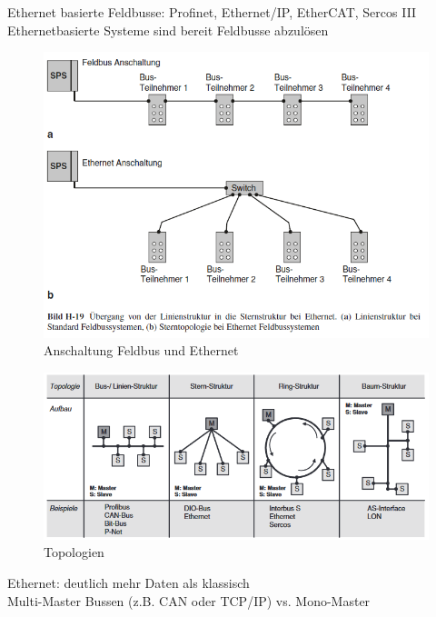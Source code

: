\documentclass[ a4paper,
                oneside,
                toc=bibliography,
                toc=listof
                ]{scrbook}
\begin{document}
	Ethernet basierte Feldbusse: Profinet, Ethernet/IP, EtherCAT, Sercos III \\
	Ethernetbasierte Systeme sind bereit Feldbusse abzulösen \\
	\begin{figure}[!ht]
		\centering
		\includegraphics[width=1.0\linewidth]{./images/Feldbus vs Ethernet Anschaltung.png}
		\caption{Anschaltung Feldbus und Ethernet \cite{hering2012elektrotechnik}}
		\label{fig:Anschaltung Bus}
	\end{figure}
	\begin{figure}[!ht]
		\centering
		\includegraphics[width=1.0\linewidth]{./images/Topologien.png}
		\caption{Topologien}
		\label{fig:Topologien}
	\end{figure}
	Ethernet: deutlich mehr Daten als klassisch \\
	Multi-Master Bussen (z.B. CAN oder TCP/IP) vs. Mono-Master
	
\end{document}
